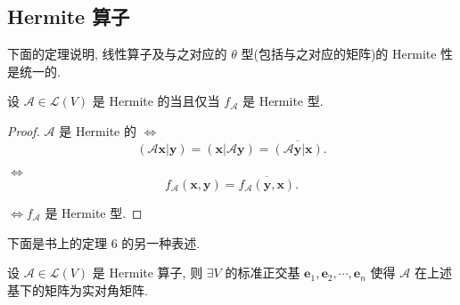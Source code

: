 \documentclass{ctexart}
\begin{document}
\subsection{Hermite 算子}
下面的定理说明, 线性算子及与之对应的 $\theta$ 型(包括与之对应的矩阵)的 Hermite 性是统一的.
\begin{theorem}
    设 $\mathcal{A}\in\mathcal{L}(V)$ 是 Hermite 的当且仅当 $f_\mathcal{A}$ 是 Hermite 型.
\end{theorem}
\begin{proof}
    $\mathcal{A}$ 是 Hermite 的 $\Leftrightarrow$
    \[(\mathcal{A}\boldsymbol{x}|\boldsymbol{y})=(\boldsymbol{x}|\mathcal{A}\boldsymbol{y})=\overline{(\mathcal{A}\boldsymbol{y}|\boldsymbol{x})}.\]

    $\Leftrightarrow$
    \[f_\mathcal{A}(\boldsymbol{x},\boldsymbol{y})=\overline{f_\mathcal{A}(\boldsymbol{y},\boldsymbol{x})}.\]

    $\Leftrightarrow f_\mathcal{A}$ 是 Hermite 型.
\end{proof}
下面是书上的定理 6 的另一种表述.
\begin{theorem}[书上的定理 6]\label{t3.5}
    设 $\mathcal{A}\in\mathcal{L}(V)$ 是 Hermite 算子, 则 $\exists V$ 的标准正交基 $\boldsymbol{e}_1,\boldsymbol{e}_2,\cdots,\boldsymbol{e}_n$ 使得 $\mathcal{A}$ 在上述基下的矩阵为实对角矩阵.
\end{theorem}
\end{document}
